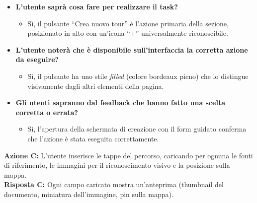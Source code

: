 \begin{itemize}[nosep, leftmargin=1.6em]
    \item \textbf{L'utente saprà cosa fare per realizzare il task?}
    \begin{itemize}[nosep, leftmargin=1.6em]
        \item Sì, il pulsante ``Crea nuovo tour'' è l'azione primaria della sezione, posizionato in alto con un'icona ``+'' universalmente riconoscibile.
    \end{itemize}
    \item \textbf{L'utente noterà che è disponibile sull'interfaccia la corretta azione da eseguire?}
    \begin{itemize}[nosep, leftmargin=1.6em]
        \item Sì, il pulsante ha uno stile \textit{filled} (colore bordeaux pieno) che lo distingue visivamente dagli altri elementi della pagina.
    \end{itemize}
    \item \textbf{Gli utenti sapranno dal feedback che hanno fatto una scelta corretta o errata?}
    \begin{itemize}[nosep, leftmargin=1.6em]
        \item Sì, l'apertura della schermata di creazione con il form guidato conferma che l'azione è stata eseguita correttamente.
    \end{itemize}
\end{itemize}

\vspace{0.3cm}
\noindent\textbf{Azione C:} L'utente inserisce le tappe del percorso, caricando per ognuna le fonti di riferimento, le immagini per il riconoscimento visivo e la posizione sulla mappa.\\
\textbf{Risposta C:} Ogni campo caricato mostra un'anteprima (thumbnail del documento, miniatura dell'immagine, pin sulla mappa).

